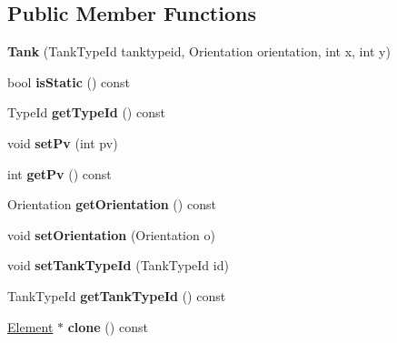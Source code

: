 \subsection*{Public Member Functions}
\begin{DoxyCompactItemize}
\item 
\mbox{\label{classstate_1_1_tank_aa06104e09cb1fd7c92159babf64a9b54}} 
{\bfseries Tank} (Tank\+Type\+Id tanktypeid, Orientation orientation, int x, int y)
\item 
\mbox{\label{classstate_1_1_tank_a3a0342c57ef771c0bb3f04cede384891}} 
bool {\bfseries is\+Static} () const
\item 
\mbox{\label{classstate_1_1_tank_ab1c8d302d263e6461c633477dc92473a}} 
Type\+Id {\bfseries get\+Type\+Id} () const
\item 
\mbox{\label{classstate_1_1_tank_a11a64c116f8bed48f8d73f5712cd073e}} 
void {\bfseries set\+Pv} (int pv)
\item 
\mbox{\label{classstate_1_1_tank_a4c567fbc4dfe80c8f342d5fc7d74bcf3}} 
int {\bfseries get\+Pv} () const
\item 
\mbox{\label{classstate_1_1_tank_aca6c9a90d94a81d0d95dabeb1d378297}} 
Orientation {\bfseries get\+Orientation} () const
\item 
\mbox{\label{classstate_1_1_tank_ae74c06cfa4e5fdd8834670d3019f770b}} 
void {\bfseries set\+Orientation} (Orientation o)
\item 
\mbox{\label{classstate_1_1_tank_a091c2f4a6d33caee15602706d2ab0ffa}} 
void {\bfseries set\+Tank\+Type\+Id} (Tank\+Type\+Id id)
\item 
\mbox{\label{classstate_1_1_tank_a5abc3898a0b6c4ab279111222afd4555}} 
Tank\+Type\+Id {\bfseries get\+Tank\+Type\+Id} () const
\item 
\mbox{\label{classstate_1_1_tank_a088768d906ca877fda341ce9eab04882}} 
\hyperlink{classstate_1_1_element}{Element} $\ast$ {\bfseries clone} () const
\end{DoxyCompactItemize}
